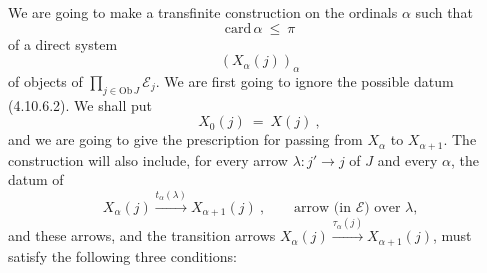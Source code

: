 \documentclass[11pt]{article}
\newcommand{\printedpage}[1]{\marginpar{\footnotesize p.~#1}}
\newcommand{\msp}[1]{\marginpar{\footnotesize [#1]}}
\newcommand{\Ob}{\mathrm{Ob}\,}
\newcommand{\card}{\mathrm{card}\,}
\begin{document}
We are going to make a transfinite construction on the ordinals $\alpha$ such that
\[
\card\alpha\ \leqslant\ \pi
\]
of a direct system
\[
(X_\alpha(j))_\alpha
\]
of objects of $\prod_{j\in\Ob J}\mathcal{E}_j$. We are first going to ignore the possible datum (4.10.6.2). We shall put
\[
X_0(j)\ =\ X(j)\ , \tag*{(4.10.6.4)}
\]
and we are going to give the prescription for passing from $X_\alpha$ to $X_{\alpha+1}$. The construction will also include, for every arrow $\lambda : j'\longrightarrow j$ of $J$ and every $\alpha$, the datum of
\[
X_\alpha(j) \xrightarrow{t_\alpha(\lambda)} X_{\alpha+1}(j)\ , \qquad \text{arrow (in $\mathcal{E}$) over $\lambda$,} \tag*{(4.10.6.5)} %
\]
and these arrows, and the transition arrows $X_\alpha(j)\xrightarrow{\tau_\alpha(j)}X_{\alpha+1}(j)$, must
\printedpage{97}
\msp{256}
satisfy the following three conditions:
\end{document}
